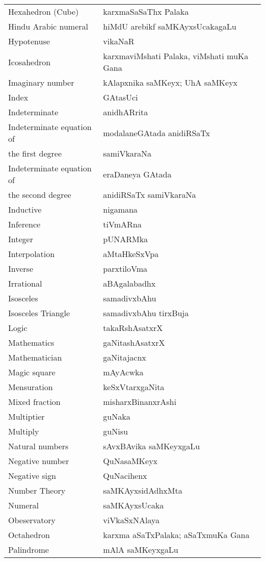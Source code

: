 {\begin{longtable}{>{\rm}l@{\hspace{1cm}}l}
Hexahedron (Cube) & karxmaSaSaThx Palaka\\
Hindu Arabic numeral & hiMdU arebikf saMKAyxsUcakagaLu\\
Hypotenuse & vikaNaR\\
Icosahedron & karxmaviMshati Palaka, viMshati muKa Gana\\
Imaginary number  & kAlapxnika saMKeyx; UhA saMKeyx\\
Index & GAtasUci\\
Indeterminate & anidhARrita\\
Indeterminate equation of & modalaneGAtada anidiRSaTx\\[-0.1cm]
the first degree & samiVkaraNa\\
Indeterminate equation of & eraDaneya GAtada\\[-0.1cm] 
the second degree &  anidiRSaTx samiVkaraNa\\
Inductive & nigamana\\
Inference & tiVmARna\\
Integer & pUNARMka\\
Interpolation & aMtaHkeSxVpa\\
Inverse & parxtiloVma\\
Irrational & aBAgalabadhx\\
Isosceles & samadivxbAhu\\
Isosceles Triangle & samadivxbAhu tirxBuja\\
Logic & takaRshAsatxrX\\
Mathematics & gaNitashAsatxrX\\
Mathematician & gaNitajacnx\\
Magic square & mAyAcwka\\
Mensuration & keSxVtarxgaNita\\
Mixed fraction & misharxBinanxrAshi\\
Multiptier & guNaka\\
Multiply & guNisu\\
Natural numbers & sAvxBAvika saMKeyxgaLu\\
Negative number & QuNasaMKeyx\\
Negative sign & QuNacihenx\\
Number Theory & saMKAyxsidAdhxMta\\
Numeral & saMKAyxsUcaka\\
Obeservatory & viVkaSxNAlaya\\
Octahedron & karxma aSaTxPalaka; aSaTxmuKa Gana\\
Palindrome & mAlA saMKeyxgaLu\\

\end{longtable}}
